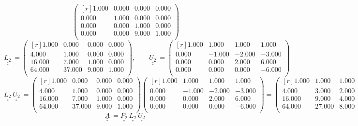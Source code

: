 \documentclass{report}[10pts]
\begin{document}
\begin{enumerate}[- Ex. 1]
\begin{itemize}
\[\begin{pmatrix*}[r]
         1.000 & 0.000 & 0.000 & 0.000\\
         0.000 & 1.000 & 0.000 & 0.000\\
         0.000 & 0.000 & 1.000 & 0.000\\
         0.000 & 0.000 & 9.000 & 1.000\\
      \end{pmatrix*}
\]
\[
   \underline{\underline{L_{2}}}~
   =
      \begin{pmatrix*}[r]
         1.000 & 0.000 & 0.000 & 0.000\\
         4.000 & 1.000 & 0.000 & 0.000\\
         16.000 & 7.000 & 1.000 & 0.000\\
         64.000 & 37.000 & 9.000 & 1.000\\
      \end{pmatrix*}
   ,\qquad
   \underline{\underline{U_{2}}}~
   =
      \begin{pmatrix*}[r]
         1.000 & 1.000 & 1.000 & 1.000\\
         0.000 & -1.000 & -2.000 & -3.000\\
         0.000 & 0.000 & 2.000 & 6.000\\
         0.000 & 0.000 & 0.000 & -6.000\\
      \end{pmatrix*}
\]
\[
   \underline{\underline{L_{2}}}~
   \underline{\underline{U_{2}}}~
   =
      \begin{pmatrix*}[r]
         1.000 & 0.000 & 0.000 & 0.000\\
         4.000 & 1.000 & 0.000 & 0.000\\
         16.000 & 7.000 & 1.000 & 0.000\\
         64.000 & 37.000 & 9.000 & 1.000\\
      \end{pmatrix*}
      \begin{pmatrix*}[r]
         1.000 & 1.000 & 1.000 & 1.000\\
         0.000 & -1.000 & -2.000 & -3.000\\
         0.000 & 0.000 & 2.000 & 6.000\\
         0.000 & 0.000 & 0.000 & -6.000\\
      \end{pmatrix*}
   =
      \begin{pmatrix*}[r]
         1.000 & 1.000 & 1.000 & 1.000\\
         4.000 & 3.000 & 2.000 & 1.000\\
         16.000 & 9.000 & 4.000 & 1.000\\
         64.000 & 27.000 & 8.000 & 1.000\\
      \end{pmatrix*}
\]
\[
   \underline{\underline{A}}~
   =
   \underline{\underline{P_{2}}}~
   \underline{\underline{L_{2}}}~
   \underline{\underline{U_{2}}}~
\]
\end{itemize}
\clearpage
\end{enumerate}
\end{document}
